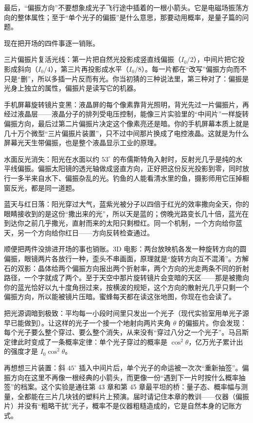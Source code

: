 最后，“偏振方向”不要想象成光子飞行途中插着的一根小箭头。它是电磁场振荡方向的整体属性；至于“单个光子的偏振”是什么意思，那要动用概率，是量子篇的问题。


现在把开场的四件事逐一销账。

三片偏振片复活光线：第一片把自然光投影成竖直线偏振（\(I_0/2\)），中间片把它投影成斜向（\(I_0/4\)），第三片再投影成水平（\(I_0/8\)）。每一片都在“改写”偏振方向而不只是“删”，所以多插一片反而有光。你当初猜的三种说法里，第三种对了：偏振是光身上独立的属性，偏振片是读写它的机器。

手机屏幕旋转镜片变黑：液晶屏的每个像素靠背光照明，背光先过一片偏振片，再经过液晶层——液晶分子的排列受电压控制，能像三片实验里的“中间片”一样旋转偏振方向，最后过第二片偏振片决定这个像素亮还是暗。你的手机屏幕本质上就是几十万个微型“三片偏振片装置”，只不过中间那片换成了电控液晶。这就是为什么屏幕光天生带偏振，也是整个液晶显示工业的原理。

水面反光消失：阳光在水面以约 \(53^\circ\) 的布儒斯特角入射时，反射光几乎是纯的水平线偏振。偏振太阳镜的透光轴做成竖直方向，正好把这份反光投影到零，同时放行一多半来自水下、偏振杂乱的光。钓鱼的人能看清水里的鱼，摄影师用它压掉橱窗反光，都是同一道题。

蓝天与红日落：阳光穿过大气，蓝紫光被分子以四倍于红光的效率撒向全天，你的眼睛接收到的是这份“撒出来的光”，所以天是蓝的；傍晚光路变长几十倍，蓝光在到达你之前几乎撒光，直射而来的太阳只剩橙红。同一个机制，一个方向给你蓝天，另一个方向给你红日——方向反转检查通过。

顺便把两件没排进开场的事也销账。3D 电影：两台放映机各发一种旋转方向的圆偏振，眼镜两片各放行一种，歪头不串画面，原理就是“旋转方向互不混淆”。方解石的双影：晶体给两个偏振方向报出两个折射率，两个方向的光走两条不同的折射路径，一个字就成了两个。至于天空中那片旋转镜片会变暗的天区——那是被撒向你的蓝光恰好以九十度角拐过来，按横波的规矩，这个方向的散射光几乎只剩一个偏振方向，所以能被镜片压暗。蜜蜂每天都在读这张地图，你现在也会读了。


\begin{thought}[一次只放一个光子]
把光源调暗到极致：平均每一小段时间里只发出一个光子（现代实验室用单光子源早已能做到）。让这样的光子一个接一个地射向两片夹角 \(\theta\) 的偏振片。你会发现：每个光子要么整个穿过、要么整个消失，从来没有“穿过八分之一个光子”。马吕斯定律此时变成了一条概率定律：单个光子穿过的概率是 \(\cos^2\theta\)，亿万光子累计出的强度才是 \(I_0\cos^2\theta\)。

再想想三片装置：斜 \(45^\circ\) 插入中间片后，单个光子的命运被一次次“重新抽签”。偏振方向在这里不再像一根经典的小箭头，而更像一份“遇到下一片时按什么概率抽签”的档案。这个实验是通往第 43 章和第 45 章最平坦的桥：量子态、概率幅与测量，全都能在三片几块钱的塑料片上预演。届时请记住本章的教训——仪器（偏振片）并没有“粗略干扰”光子，概率不是仪器粗糙造成的，它是自然本身的记账方式。
\end{thought}

